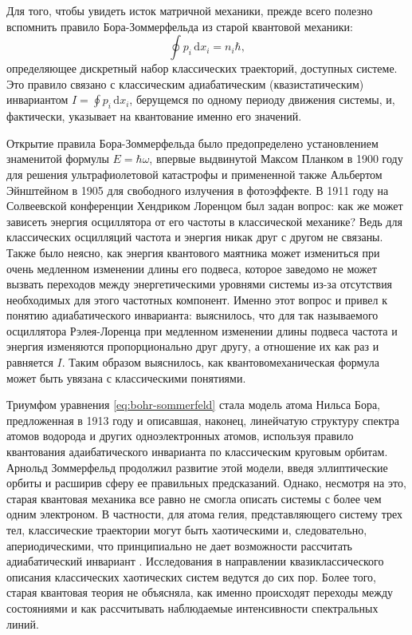 \documentclass[14pt, a4paper]{extreport}
\newcommand{\diff}{\,\mathrm{d}}
\numberwithin{equation}{section}
\begin{document}
Для того, чтобы увидеть исток матричной механики, прежде всего полезно вспомнить правило Бора-Зоммерфельда из старой квантовой механики:
\begin{equation}
	\oint p_i \diff x_i = n_i \hbar, \label{eq:bohr-sommerfeld}
\end{equation}
определяющее дискретный набор классических траекторий, доступных системе. Это правило связано с классическим адиабатическим (квазистатическим) инвариантом $I = \oint p_i \diff x_i$, берущемся по одному периоду движения системы, и, фактически, указывает на квантование именно его значений. 

Открытие правила Бора-Зоммерфельда было предопределено установлением знаменитой формулы $E = \hbar \omega$, впервые выдвинутой Максом Планком в 1900 году для решения ультрафиолетовой катастрофы и примененной также Альбертом Эйнштейном в 1905 для свободного излучения в фотоэффекте. В 1911 году на Солвеевской конференции Хендриком Лоренцом был задан вопрос: как же может зависеть энергия осциллятора от его частоты в классической механике? Ведь для классических осцилляций частота и энергия никак друг с другом не связаны. Также было неясно, как энергия квантового маятника может измениться при очень медленном изменении длины его подвеса, которое заведомо не может вызвать переходов между энергетическими уровнями системы из-за отсутствия необходимых для этого частотных компонент. Именно этот вопрос и привел к понятию адиабатического инварианта: выяснилось, что для так называемого осциллятора Рэлея-Лоренца при медленном изменении длины подвеса частота и энергия изменяются пропорционально друг другу, а отношение их как раз и равняется $I$. Таким образом выяснилось, как квантовомеханическая формула может быть увязана с классическими понятиями.

Триумфом уравнения \eqref{eq:bohr-sommerfeld} стала модель атома Нильса Бора, предложенная в 1913 году и описавшая, наконец, линейчатую структуру спектра атомов водорода и других одноэлектронных атомов, используя правило квантования адаибатического инварианта по классическим круговым орбитам. Арнольд Зоммерфельд продолжил развитие этой модели, введя эллиптические орбиты и расширив сферу ее правильных предсказаний. Однако, несмотря на это, старая квантовая механика все равно не смогла описать системы с более чем одним электроном. В частности, для атома гелия, представляющего систему трех тел, классические траектории могут быть хаотическими и, следовательно, апериодическими, что принципиально не дает возможности рассчитать адиабатический инвариант \cite{wintgen1992semiclassical}. Исследования в направлении квазиклассического описания классических хаотических систем ведутся до сих пор. Более того, старая квантовая теория не объясняла, как именно происходят переходы между состояниями и как рассчитывать наблюдаемые интенсивности спектральных линий.
\end{document}

